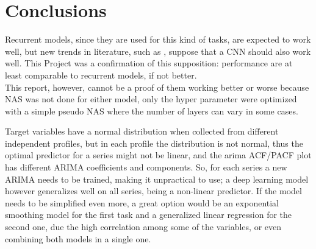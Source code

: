 \section{Conclusions}
Recurrent models, since they are used for this kind of tasks, are expected to work well, but new trends in literature, such as \cite{cnn_time}\cite{cnn_time_2}, suppose that a CNN should also work well. This Project was a confirmation of this supposition: performance are at least comparable to recurrent models, if not better. \\
This report, however, cannot be a proof of them working better or worse because NAS was not done for either model, only the hyper parameter were optimized with a simple pseudo NAS where the number of layers can vary in some cases.

Target variables have a normal distribution when collected from different independent profiles, but in each profile the distribution is not normal, thus the optimal predictor for a series might not be linear, and the arima ACF/PACF plot has different ARIMA coefficients and components.
So, for each series a new ARIMA needs to be trained, making it unpractical to use; a deep learning model however generalizes well on all series, being a non-linear predictor.
If the model needs to be simplified even more, a great option would be an exponential smoothing model for the first task and a generalized linear regression for the second one, due the high correlation among some of the variables, or even combining both models in a single one.

